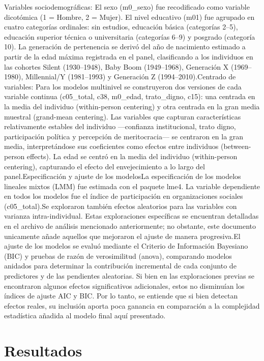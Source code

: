 \documentclass[
  spanish,
  a4paper,
  oneside]{scrbook}
\begin{document}
Variables sociodemográficas: El sexo (m0\_sexo) fue recodificado como
variable dicotómica (1 = Hombre, 2 = Mujer). El nivel educativo (m01)
fue agrupado en cuatro categorías ordinales: sin estudios, educación
básica (categorías 2--5), educación superior técnica o universitaria
(categorías 6--9) y posgrado (categoría 10). La generación de
pertenencia se derivó del año de nacimiento estimado a partir de la edad
máxima registrada en el panel, clasificando a los individuos en las
cohortes Silent (1930--1948), Baby Boom (1949--1968), Generación X
(1969--1980), Millennial/Y (1981--1993) y Generación Z
(1994--2010).Centrado de variables: Para los modelos multinivel se
construyeron dos versiones de cada variable continua (c05\_total, c38,
m0\_edad, trato\_digno, c15): una centrada en la media del individuo
(within-person centering) y otra centrada en la gran media muestral
(grand-mean centering). Las variables que capturan características
relativamente estables del individuo ---confianza institucional, trato
digno, participación política y percepción de meritocracia--- se
centraron en la gran media, interpretándose sus coeficientes como
efectos entre individuos (between-person effects). La edad se centró en
la media del individuo (within-person centering), capturando el efecto
del envejecimiento a lo largo del panel.Especificación y ajuste de los
modelosLa especificación de los modelos lineales mixtos (LMM) fue
estimada con el paquete lme4. La variable dependiente en todos los
modelos fue el índice de participación en organizaciones sociales
(c05\_total).Se exploraron también efectos aleatorios para las variables
con varianza intra-individual. Estas exploraciones específicas se
encuentran detalladas en el archivo de análisis mencionado
anteriormente; no obstante, este documento unicamente añade aquellos que
mejoraron el ajuste de manera progresiva.El ajuste de los modelos se
evaluó mediante el Criterio de Información Bayesiano (BIC) y pruebas de
razón de verosimilitud (anova), comparando modelos anidados para
determinar la contribución incremental de cada conjunto de predictores y
de las pendientes aleatorias. Si bien en las exploraciones previas se
encontraron algunos efectos significativos adicionales, estos no
disminuían los índices de ajuste AIC y BIC. Por lo tanto, se entiende
que si bien detectan efectos reales, su inclusión aporta poca ganancia
en comparación a la complejidad estadística añadida al modelo final aquí
presentado.


\chapter{Resultados}\label{resultados}
\end{document}
